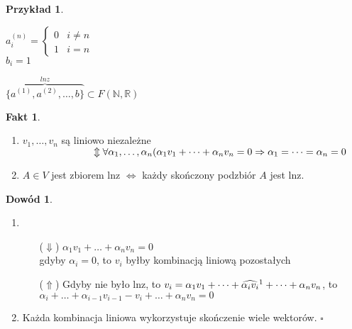 \documentclass[12pt,a4paper]{article}
\newcommand{\RR}{\mathbb{R}}
\renewcommand{\qed}{$\square$}
\theoremstyle{plain}
\theoremstyle{definition}
\newtheorem{ft}{Fakt}[section]
\theoremstyle{definition}
\theoremstyle{definition}
\theoremstyle{definition}
\newtheorem*{dd}{Dowód}
\theoremstyle{definition}
\newtheorem*{prz}{Przykład}
\theoremstyle{definition}
\theoremstyle{definition}
\theoremstyle{definition}
\begin{document}
\begin{prz}
    ~\\
    \begin{minipage}[t]{0.5\textwidth}
    $
    a^{(n)}_i = \begin{cases}
                0 & i \neq n \\ 
                1 & i = n
              \end{cases}
    $ \\
    $b_i = 1$
    \end{minipage}%
    \begin{minipage}[t]{0.5\textwidth}
       $\overbrace{\{a^{(1)},a^{(2)},\dots,b\}}^{lnz} \subset F(\mathbb{N},\RR)$
        
    \end{minipage}
\end{prz}

\newpage

\begin{ft} \hfill
    \begin{enumerate}[{(}1{)}]
         \item $v_1,\dots,v_n$ są liniowo niezależne \\
        $ \hspace*{25mm} \Updownarrow 
        \\ 
        \forall \alpha_1,\dots,\alpha_n(\alpha_1v_1+\dots+\alpha_nv_n = 0 \Rightarrow \alpha_1 = \dots = \alpha_n =0$ 
        \item $A \in V $ jest zbiorem lnz $\iff$ każdy skończony podzbiór $A$ jest lnz.
    \end{enumerate}
\end{ft}

\begin{dd} \hfill 
    \begin{enumerate}[{(}1{)}]
        \item \begin{itemize}
            \item[($\Downarrow$)] $\alpha_1v_1 + \dots + \alpha_nv_n = 0$ \\
                gdyby $\alpha_i = 0 $, to $v_i$ byłby kombinacją liniową pozostałych \lightning
            \item[($\Uparrow$)] Gdyby nie było lnz, to $v_i = \alpha_1v_1+\dots+ \widehat{\alpha_i v_i} \text{\footnotemark} +\dots + \alpha_nv_n$, to \\ $\alpha_i + \dots + \alpha_{i-1}v_{i-1} - v_i + \dots + \alpha_nv_n = 0 $ \lightning
        \end{itemize}
        \item Każda kombinacja liniowa wykorzystuje skończenie wiele wektorów. \qed
    \end{enumerate}
\end{dd} 
\end{document}
